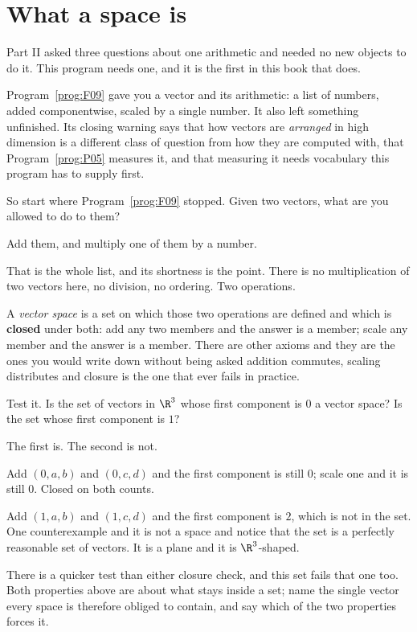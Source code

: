\section{What a space is}
\label{sec:P04-space}

\begin{fr}
Part II asked three questions about one arithmetic and needed no new objects to
do it. This program needs one, and it is the first in this book that does.

Program~\ref{prog:F09} gave you a vector and its arithmetic: a list of numbers,
added componentwise, scaled by a single number. It also left something
unfinished. Its closing warning says that how vectors are \emph{arranged} in
high dimension is a different class of question from how they are computed with,
that Program~\ref{prog:P05} measures it, and that measuring it needs vocabulary
this program has to supply first.

So start where Program~\ref{prog:F09} stopped. Given two vectors, what are you
allowed to do to them?
\nextframe
\end{fr}

\begin{fr}
\begin{ansblock}
Add them, and multiply one of them by a number.
\end{ansblock}

That is the whole list, and its shortness is the point. There is no
multiplication of two vectors here, no division, no ordering. Two operations.

A \emph{vector space} is a set on which those two operations are defined and
which is \textbf{closed} under both: add any two members and the answer is a
member; scale any member and the answer is a member. There are other axioms and
they are the ones you would write down without being asked \dash{} addition
commutes, scaling distributes \dash{} and closure is the one that ever fails in
practice.

Test it. Is the set of vectors in $\R^{3}$ whose first component is $0$ a
vector space? Is the set whose first component is $1$?
\nextframe
\end{fr}

\begin{fr}
\begin{ansblock}
The first is. The second is not.
\end{ansblock}

Add $(0, a, b)$ and $(0, c, d)$ and the first component is still $0$; scale one
and it is still $0$. Closed on both counts.

Add $(1, a, b)$ and $(1, c, d)$ and the first component is $2$, which is not in
the set. One counterexample and it is not a space \dash{} and notice that the
set is a perfectly reasonable set of vectors. It is a plane and it is
$\R^{3}$-shaped.

There is a quicker test than either closure check, and this set fails that one
too. Both properties above are about what stays inside a set; name the single
vector every space is therefore obliged to contain, and say which of the two
properties forces it.
\dotline
\nextframe
\end{fr}

